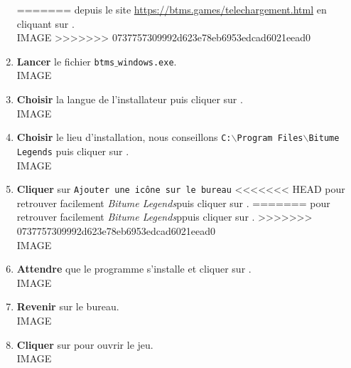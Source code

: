 \documentclass[a4paper,12pt]{article}
\newcommand{\btmlgs}{\textsl{Bitume Legends}}
\begin{document}
\begin{enumerate}
=======
                depuis le site \url{https://btms.games/telechargement.html} en
                cliquant sur .
                \\IMAGE
>>>>>>> 0737757309992d623e78eb6953edcad6021eead0
            \item
                \textbf{Lancer} le fichier \texttt{btms$\_$windows.exe}.
                \\IMAGE
            \item 
                \textbf{Choisir} la langue de l'installateur puis cliquer sur
                .
                \\IMAGE
            \item 
                \textbf{Choisir} le lieu d'installation, nous conseillons
                \texttt{C:$\backslash${Program} Files$\backslash${Bitume Legends}}
                puis cliquer sur .
                \\IMAGE
            \item 
                \textbf{Cliquer} sur \texttt{Ajouter une icône sur le bureau}
<<<<<<< HEAD
                pour retrouver facilement \btmlgs puis cliquer sur .
=======
                pour retrouver facilement \btmlgs ppuis cliquer sur .
>>>>>>> 0737757309992d623e78eb6953edcad6021eead0
                \\IMAGE
            \item 
                \textbf{Attendre} que le programme s'installe et cliquer sur
                .
                \\IMAGE
            \item 
                \textbf{Revenir} sur le bureau.
                \\IMAGE
            \item
                \textbf{Cliquer} sur \fbox{\btmlgs} pour ouvrir le jeu.
                \\IMAGE
        \end{enumerate}
        \clearpage
\end{document}
